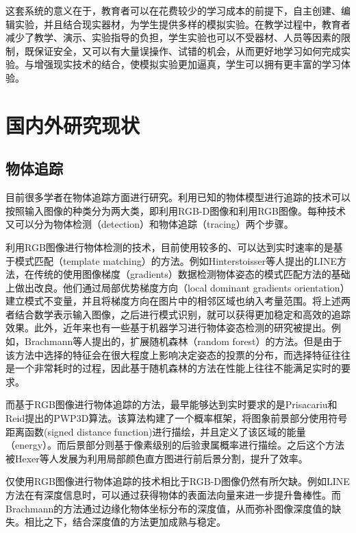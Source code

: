这套系统的意义在于，教育者可以在花费较少的学习成本的前提下，自主创建、编辑实验，并且结合现实器材，为学生提供多样的模拟实验。在教学过程中，教育者减少了教学、演示、实验指导的负担，学生实验也可以不受器材、人员等因素的限制，既保证安全，又可以有大量误操作、试错的机会，从而更好地学习如何完成实验。与增强现实技术的结合，使模拟实验更加逼真，学生可以拥有更丰富的学习体验。


\section{国内外研究现状}
\subsection{物体追踪}
目前很多学者在物体追踪方面进行研究。利用已知的物体模型进行追踪的技术可以按照输入图像的种类分为两大类，即利用RGB-D图像和利用RGB图像。每种技术又可以分为物体检测（detection）和物体追踪（tracing）两个步骤。

利用RGB图像进行物体检测的技术，目前使用较多的、可以达到实时速率的是基于模式匹配（template matching）的方法。例如Hinterstoisser等人提出的LINE方法\cite{hinterstoisser2011gradient}，在传统的使用图像梯度（gradients）数据检测物体姿态的模式匹配方法的基础上做出改良。他们通过局部优势梯度方向（local dominant gradients orientation）建立模式不变量，并且将梯度方向在图片中的相邻区域也纳入考量范围。将上述两者结合数学表示输入图像，之后进行模式识别，就可以获得更加稳定和高效的追踪效果。此外，近年来也有一些基于机器学习进行物体姿态检测的研究被提出。例如，Brachmann等人提出的，扩展随机森林（random forest）的方法。\cite{brachmann2016uncertainty}但是由于该方法中选择的特征会在很大程度上影响决定姿态的投票的分布，而选择特征往往是一个非常耗时的过程，因此基于随机森林的方法在性能上往往不能满足实时的要求。

而基于RGB图像进行物体追踪的方法，最早能够达到实时要求的是Prisacariu和Reid提出的PWP3D算法\cite{prisacariu2012pwp3d}。该算法构建了一个概率框架，将图象前景部分使用符号距离函数(signed distance function)进行描绘，并且定义了该区域的能量（energy）。而后景部分则基于像素级别的后验隶属概率进行描绘。之后这个方法被Hexer等人发展为利用局部颜色直方图进行前后景分割，提升了效率。\cite{hexner20162d}

仅使用RGB图像进行物体追踪的技术相比于RGB-D图像仍然有所欠缺。例如LINE方法\cite{hinterstoisser2011gradient}在有深度信息时，可以通过获得物体的表面法向量来进一步提升鲁棒性。而Brachmann的方法\cite{brachmann2016uncertainty}通过边缘化物体坐标分布的深度值，从而弥补图像深度值的缺失。相比之下，结合深度值的方法更加成熟与稳定。


